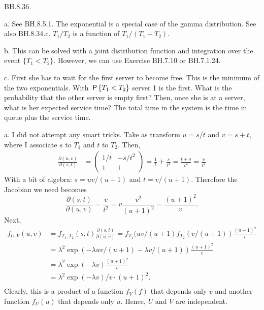 \begin{exercise}
BH.8.36.
\begin{hint}
a. See BH.8.5.1. The exponential is a special case of the gamma distribution. See also BH.8.34.c. $T_1/T_2$ is a function of $T_1/(T_1+T_2)$.

b. This can be solved with a joint distribution function and integration over the event $\{T_1<T_2\}$. However, we can use Exercise BH.7.10 or BH.7.1.24.

c. First she has to wait for the first server to become free. This is the minimum of the two exponentials.
With $\P{T_1<T_2}$ server 1 is the first.
What is the probability that the other server is empty first? Then, once she is at a server, what is her expected service time? The total time in the system is the time in queue plus the service time.
\end{hint}
\begin{solution}
a. I did not attempt any smart tricks. Take as transform $u=s/t$ and $v=s+t$, where I associate $s$ to $T_{1}$ and $t$  to $T_2$. Then,
\begin{align*}
\frac{\partial (u,v)}{\partial (s,t)} &=
  \begin{pmatrix}
    1/t & -s/t^{2} \\
1 & 1
  \end{pmatrix} = \frac 1 t + \frac{s}{t^{2}} = \frac{t+s}{t^{2}} = \frac{v}{t^{2}}
\end{align*}
With a bit of algebra: $s=uv/(u+1)$ and $t=v/(u+1)$.
Therefore the Jacobian we need becomes
\begin{equation}
\label{eq:12}
\frac{\partial (s,t)}{\partial (u,v)} = \frac{v}{t^{2}} = v \frac{v^2}{(u+1)^2} = \frac{(u+1)^{2}}{v}.
\end{equation}
Next,
\begin{align*}
  f_{U, V}(u,v) &= f_{T_1,T_2}(s,t) \frac{\partial (s,t)}{\partial (u,v)}
  =  f_{T_1}(uv/(u+1) f_{T_2}(v/(u+1)) \frac{(u+1)^{2}}{v} \\
  &=  \lambda^{2} \exp(-\lambda uv/(u+1) - \lambda v/(u+1)) \frac{(u+1)^{2}}{v} \\
  &=  \lambda^{2} \exp(-\lambda v) \frac{(u+1)^{2}}{v} \\
  &=  \lambda^{2} \exp(-\lambda v)/v \cdot  (u+1)^{2}. \\
\end{align*}
Clearly, this is a product of a function $f_{V}(f)$ that depends only  $v$ and another function $f_U(u)$ that depends  only $u$. Hence, $U$ and $V$ are independent.


\end{solution}
\end{exercise}
